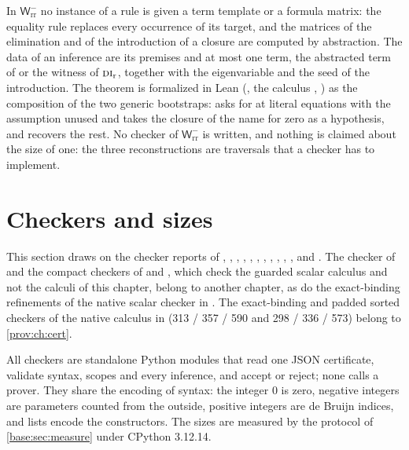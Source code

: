 In $\mathsf{W}^{-}_{\mathrm{rr}}$ no instance of a rule is given a term
template or a formula matrix: the equality rule replaces every occurrence of
its target, and the matrices of the elimination and of the introduction of a
closure are computed by abstraction.  The data of an inference are its
premises and at most one term, the abstracted term of  or the
witness of $\rulename{DI}_{\mathrm r}$, together with the eigenvariable and
the seed of the introduction.  The theorem is formalized in Lean
(, the calculus ,
) as the composition of the two generic bootstraps:
 asks for  at literal equations with the
assumption unused and takes the closure of the name for zero as a hypothesis,
and  recovers the rest.  No checker of
$\mathsf{W}^{-}_{\mathrm{rr}}$ is written, and nothing is claimed about the
size of one: the three reconstructions are traversals that a checker has to
implement.

\section{Checkers and sizes}
\label{wit:sec:sizes}

This section draws on the checker reports of ,
, ,
, , ,
, ,
, ,
,
 and .  The checker
of  and the compact checkers of
 and , which check
the guarded scalar calculus and not the calculi of this chapter, belong to
another chapter, as do the exact-binding refinements of the native scalar
checker in .  The exact-binding and padded sorted
checkers of the native calculus in 
(313 / 357 / 590 and 298 / 336 / 573) belong to \cref{prov:ch:cert}.

All checkers are standalone Python modules that read one JSON certificate,
validate syntax, scopes and every inference, and accept or reject; none
calls a prover.  They share the encoding of syntax: the integer $0$ is
zero, negative integers are parameters counted from the outside, positive
integers are de Bruijn indices, and lists encode the constructors.  The
sizes are measured by the protocol of \cref{base:sec:measure} under
CPython 3.12.14.

